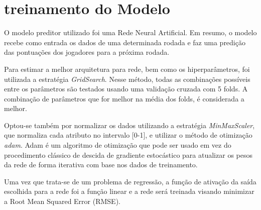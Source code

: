 \documentclass[conference]{IEEEtran}
\begin{document}
\section{treinamento do Modelo}

O modelo preditor utilizado foi uma Rede Neural Artificial. Em resumo, o  modelo recebe como entrada os dados de uma determinada rodada e faz uma predição das pontuações dos jogadores para a próxima rodada.


Para estimar a melhor arquitetura para rede, bem como os hiperparâmetros, foi utilizada a estratégia \textit{GridSearch}. Nesse método, todas as combinações possíveis entre os parâmetros são testados usando uma validação cruzada com 5 folds. A combinação de parâmetros que for melhor na média dos folds, é considerada a melhor.

Optou-se também por normalizar os dados utilizando a estratégia \textit{MinMaxScaler}, que normaliza cada atributo no intervalo [0-1], e utilizar o método de otimização \textit{adam}. Adam é um algoritmo de otimização que pode ser usado em vez do procedimento clássico de descida de gradiente estocástico para atualizar os pesos da rede de forma iterativa com base nos dados de treinamento.



Uma vez que trata-se de um problema de regressão, a função de ativação da saída escolhida para a rede foi a função linear e a rede será treinada visando minimizar a Root Mean Squared Error (RMSE).
\end{document}
